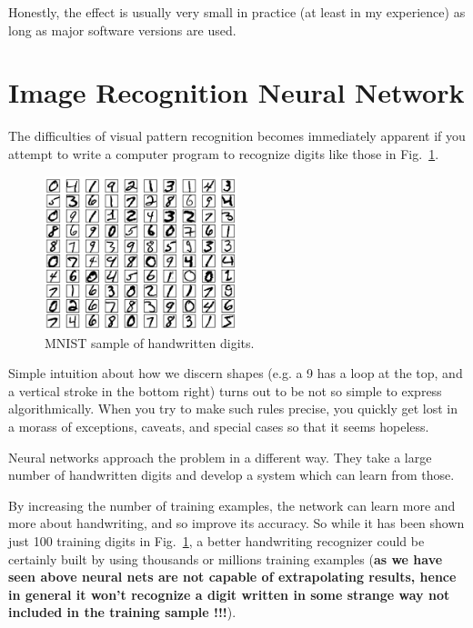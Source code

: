 Honestly, the effect is usually very small in practice (at least in my experience) as long as major software versions are used.

\section{Image Recognition Neural Network}
\label{neural-net-to-recognize-handwritten-digits}

The difficulties of visual pattern recognition becomes immediately apparent if you attempt to write a computer program to recognize digits like those in Fig.~\ref{fig:mnist}.

\begin{figure}[b]
\centering
\includegraphics[width=0.5\textwidth]{figures/mnist_100_digits}
\caption{MNIST sample of handwritten digits.}
\label{fig:mnist}
\end{figure}

Simple intuition about how we discern shapes (e.g. a 9 has a loop at the top, and a vertical stroke in the bottom right) turns out to be not so simple to express algorithmically. When you try to make such rules precise, you quickly get lost in a morass of exceptions, caveats, and special cases so that it seems hopeless.

Neural networks approach the problem in a different way. They take a large number of handwritten digits and develop a system which can learn from those.

By increasing the number of training examples, the network can learn more and more about handwriting, and so improve its accuracy. So while it has been shown just 100 training digits in Fig.~\ref{fig:mnist}, a better handwriting recognizer could be certainly built by using thousands or millions training examples (\textbf{as we have seen above neural nets are not capable of extrapolating results, hence in general it won't recognize a digit written in some strange way not included in the training sample !!!}).

